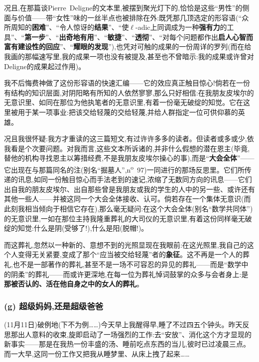 况且,在那篇谈Pierre~Deligne的文本里,被摆到聚光灯下的,恰恰是这些“男性”的侧面与价值——带“女性”味的一丝半点也被排除在外:既凭那几顶选定的形容语(“众所周知的\textbf{困难}”、“令人惊讶的\textbf{结果}”、“使$\ell$-adic上同调成为一种\textbf{强有力}的工具”、“\textbf{第一步}”、“\textbf{出奇地有用}”、“\textbf{敏捷}”、“\textbf{透彻}”、“对每个问题都作出\textbf{启人心智而富有建设性的回应}”、“\textbf{耀眼的发现}”),也凭对可触的成果的一份周详的罗列(而在给我画的那幅速写里,我的成果一项也没有被提及,甚至也不曾暗示:我的成果或许曾对Deligne的成果起过作用)。

我不后悔费神做了这份形容语的快速汇编——它的效应真正触目惊心!倘若在一份有结构的知识层面,对阴阳略有所知的人依然寥寥,那么只好相信:在我朋友皮埃尔的无意识里、如同在那位为他执笔者的无意识里,有着一份毫无破绽的知觉。它在这里被用于某一项事业:把该交给轻蔑的交给轻蔑,并给人群指定一位可供仰慕的英雄。

况且我很怀疑:我方才重读的这三篇短文,有过许许多多的读者。但读者或多或少,依我看是个次要问题。对我而言,这些文本所诉诸的,并非什么假想的潜在恩主(毕竟,替他的机构寻找恩主以筹措经费,不是我朋友皮埃尔操心的事),而是“\textbf{大会全体}”——它出现在与那篇同名的注(别名“掘墓人”,n\textsuperscript{o}~97)一同进行的那场反思里\dmark{}。它们所传递的讯息,如同一份触目惊心而手法老到的速记,浓缩了无数同方向的讯息——它们出自我的朋友皮埃尔、出自那些曾是我朋友或我的学生的人中的另一些、或许还有其他一些人——并被这同一个大会全体接收、认可。倘若存在一个集体无意识(而此刻我相当倾向于相信它存在),那么毫无疑问:在这个大会全体(别名“数学共同体”)的无意识里,一如在那位主持我隆重葬礼的大司仪的无意识里,有着这份同样毫无破绽的知觉:什么是阴(受够了!),什么是阳(脱帽!)。

而这葬礼,忽然以一种新的、意想不到的光照显现在我眼前:在这光照里,我自己的这个人变得无关紧要,变成了那个“应当被交给轻蔑”者的\textbf{象征}。这不再是一个人的葬礼,也不是一部著作的葬礼,甚至不是一场不可容忍的异见的葬礼——而是“数学中的阴柔”的葬礼——而或许更深地,在每一位为葬礼悼词鼓掌的众多与会者身上:是\textbf{那被否认的、活在他自身之中的女人的葬礼}。

\subsubsection*{(g) 超级妈妈,还是超级爸爸}
\label{ch18:local:h33}

\label{ch18:local:n29}

(11月11日)破例地(下不为例……)今天早上我醒得早,睡了不过四五个钟头。昨天反思那出人意料的收束,旋即启动了一场强烈的工作:去“安放”、消化这个方才显现的新事实——那是在我热一份丰盛的汤、睡前吃点东西的当儿,彼时已过凌晨三点。而一大早,这同一份工作又把我从睡梦里、从床上拽了起来……

